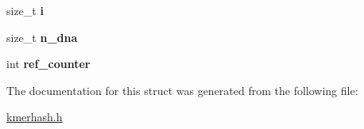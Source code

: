 \begin{DoxyCompactItemize}
\mbox{\label{structkmerhash__struct_add3d51e875b654adf0313b37e4169973}} 
size\+\_\+t {\bfseries i}
\item 
\mbox{\label{structkmerhash__struct_ae00fdd29a6150075cd0b5c18bc95d0ba}} 
size\+\_\+t {\bfseries n\+\_\+dna}
\item 
\mbox{\label{structkmerhash__struct_a9777fe24be695cb5c1b0dee5df835a8e}} 
int {\bfseries ref\+\_\+counter}
\end{DoxyCompactItemize}


The documentation for this struct was generated from the following file\+:\begin{DoxyCompactItemize}
\item 
\hyperlink{kmerhash_8h}{kmerhash.\+h}\end{DoxyCompactItemize}
